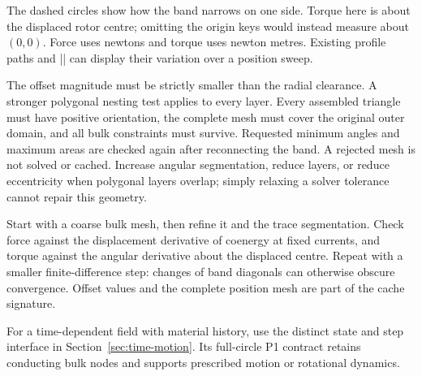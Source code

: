 \begin{codeexample}[width=0pt]
\end{codeexample}

The dashed circles show how the band narrows on one side. Torque here is about
the displaced rotor centre; omitting the origin keys would instead measure
about $(0,0)$. Force uses newtons and torque uses newton metres. Existing profile
paths and |\femmresultplot| can display their variation over a position sweep.

The offset magnitude must be strictly smaller than the radial clearance.
A stronger polygonal nesting test applies to every layer. Every assembled
triangle must have positive orientation, the complete mesh must cover the
original outer domain, and all bulk constraints must survive. Requested minimum
angles and maximum areas are checked again after reconnecting the band.
A rejected mesh is not solved or cached. Increase angular segmentation, reduce
layers, or reduce eccentricity when polygonal layers overlap; simply relaxing
a solver tolerance cannot repair this geometry.

Start with a coarse bulk mesh, then refine it and the trace segmentation.
Check force against the displacement derivative of coenergy at fixed currents,
and torque against the angular derivative about the displaced centre. Repeat
with a smaller finite-difference step: changes of band diagonals can otherwise
obscure convergence. Offset values and the complete position mesh are part of
the cache signature.


For a time-dependent field with material history, use the distinct state and step
interface in Section~\ref{sec:time-motion}. Its full-circle P1 contract retains
conducting bulk nodes and supports prescribed motion or rotational dynamics.

